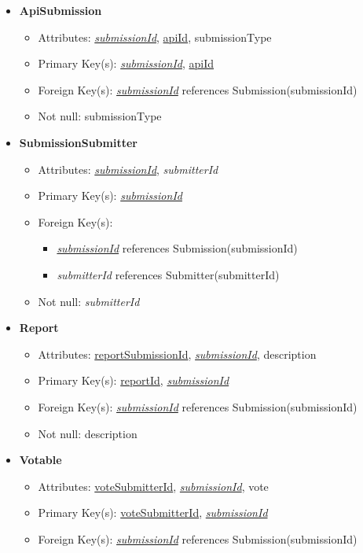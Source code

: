 \documentclass{article}
\begin{document}
\begin{itemize}
        \item \textbf{ApiSubmission}
        \begin{itemize}
            \item Attributes: \underline{\textit{submissionId}}, \underline{apiId}, submissionType
            \item Primary Key(s): \underline{\textit{submissionId}}, \underline{apiId}
            \item Foreign Key(s): \underline{\textit{submissionId}} references Submission(submissionId)
            \item Not null: submissionType
        \end{itemize}

        \item \textbf{SubmissionSubmitter}
        \begin{itemize}
            \item Attributes: \underline{\textit{submissionId}}, \textit{submitterId}
            \item Primary Key(s): \underline{\textit{submissionId}}
            \item Foreign Key(s): 
            \begin{itemize}
                \item \underline{\textit{submissionId}} references Submission(submissionId)
                \item \textit{submitterId} references Submitter(submitterId)
            \end{itemize}
            \item Not null: \textit{submitterId}
        \end{itemize}

        \item \textbf{Report}
        \begin{itemize}
            \item Attributes: \underline{reportSubmissionId}, \underline{\textit{submissionId}}, description
            \item Primary Key(s): \underline{reportId}, \underline{\textit{submissionId}}
            \item Foreign Key(s): \underline{\textit{submissionId}} references Submission(submissionId)
            \item Not null: description
        \end{itemize}

        \item \textbf{Votable}
        \begin{itemize}
            \item Attributes: \underline{voteSubmitterId}, \underline{\textit{submissionId}}, vote
            \item Primary Key(s): \underline{voteSubmitterId}, \underline{\textit{submissionId}}
            \item Foreign Key(s): \underline{\textit{submissionId}} references Submission(submissionId)          
        \end{itemize}


\end{itemize}
\end{document}

